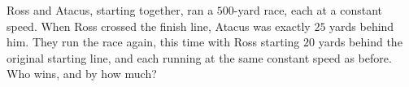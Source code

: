 Ross and Atacus, starting together, ran a $500$-yard race, each at a constant speed. When Ross crossed the finish line, Atacus was exactly $25$ yards behind him. They run the race again, this time with Ross starting $20$ yards behind the original starting line, and each running at the same constant speed as before. Who wins, and by how much?
